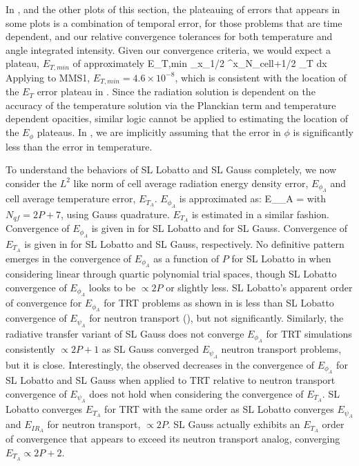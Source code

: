 In , and the other plots of this section, the plateauing of errors that appears in some plots is a combination of temporal error, for those problems that are time dependent, and our relative convergence tolerances for both temperature and angle integrated intensity. 
Given our convergence criteria, we would expect a plateau, $E_{T,min}$ of approximately
\benum
E_{T,min} \int_{x_{1/2} }^{x_{N_{cell}+1/2}}{ \epsilon_T  dx} \pep
\label{eq:err_plateau}
\eenum
Applying  to MMS1, $E_{T,min} = 4.6\times 10^{-8}$, which is consistent with the location of the $E_T$ error plateau in .
Since the radiation solution is dependent on the accuracy of the temperature solution via the Planckian term and temperature dependent opacities, similar logic cannot be applied to estimating the location of the $E_{\phi}$ plateaus.
In , we are implicitly assuming that the error in $\phi$ is significantly less than the error in temperature. 

To understand the behaviors of SL Lobatto and SL Gauss completely, we now consider the $L^2$ like norm of cell average radiation energy density error, $E_{\phi_A}$ and cell average temperature error, $E_{T_A}$.
$E_{\phi_A}$ is approximated as:
\benum
E_{\phi_A} =  \pec
\eenum
with $N_{qf} = 2P + 7$, using Gauss quadrature.  $E_{T_A}$ is estimated in a similar fashion.
Convergence of $E_{\phi_A}$ is given in  for SL Lobatto and  for SL Gauss.
Convergence of $E_{T_A}$ is given in  for SL Lobatto and SL Gauss, respectively.
No definitive pattern emerges in the convergence of $E_{\phi_A}$ as a function of $P$ for SL Lobatto in  when considering linear through quartic polynomial trial spaces, though SL Lobatto convergence of $E_{\phi_A}$ looks to be $\propto 2P$ or slightly less.
SL Lobatto's apparent order of convergence for $E_{\phi_A}$ for TRT problems as shown in  is less than SL Lobatto convergence of $E_{\psi_A}$ for neutron transport (), but not significantly. 
Similarly, the radiative transfer variant of SL Gauss does not converge $E_{\phi_A}$ for TRT simulations consistently $\propto 2P+1$ as SL Gauss converged $E_{\psi_A}$ neutron transport problems,
but it is close.  
Interestingly, the observed decreases in the convergence of $E_{\phi_A}$ for SL Lobatto and SL Gauss when applied to TRT relative to neutron transport convergence of $E_{\psi_A}$ does not hold when considering the convergence of $E_{T_A}$.  
SL Lobatto converges $E_{T_A}$ for TRT with the same order as SL Lobatto converges $E_{\psi_A}$ and $E_{IR_A}$ for neutron transport, $\propto 2P$.
SL Gauss actually exhibits an $E_{T_A}$ order of convergence that appears to exceed its neutron transport analog, converging $E_{T_A} \propto 2P+2$. \

